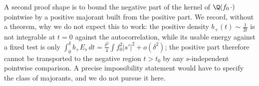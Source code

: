 \begin{remark}\label{rem:schur}
A second proof shape is to bound the negative part of the kernel of $\Q(f_0\,\cdot)$ pointwise by a positive majorant built from the positive
part. We record, without a theorem, why we do not expect this to work: the positive density $b_+(t)\sim\frac1{2t}$ is not integrable at $t=0$
against the autocorrelation, while its usable energy against a fixed test is only $\int_0^\delta b_+E_s\,dt=\frac{\delta^2}4\int f_0^2|s'|^2+o(\delta^2)$;
the positive part therefore cannot be transported to the negative region $t>t_0$ by any $s$-independent pointwise comparison. A precise
impossibility statement would have to specify the class of majorants, and we do not pursue it here.
\end{remark}
